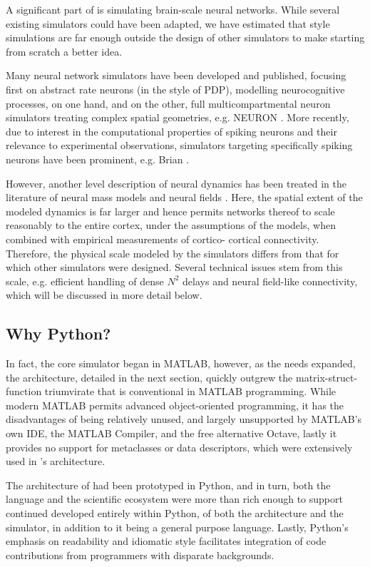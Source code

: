 A significant part of \TVB is simulating brain-scale neural networks. While
several existing simulators could have been adapted, we have estimated that
\TVB style simulations are far enough outside the design of other simulators to
make starting from scratch a better idea.

Many neural network simulators have been developed and published, focusing
first on abstract rate neurons (in the style of PDP), modelling neurocognitive
processes, on one hand, and on the other, full multicompartmental neuron
simulators treating complex spatial geometries, e.g. NEURON \cite{Hines_2001}.
More recently, due to interest in the computational properties of spiking 
neurons and their relevance to experimental observations, simulators targeting
specifically spiking neurons have been prominent, e.g. Brian 
\cite{Goodman_2009}.

However, another level description of neural dynamics has been treated
in the literature of neural mass models and neural fields 
\cite{Deco_2008a, Coombes_2010}. Here, the spatial
extent of the modeled dynamics is far larger and hence permits networks 
thereof to scale reasonably to the entire cortex, under the assumptions 
of the models, when combined with empirical measurements of cortico-
cortical connectivity. Therefore, the physical scale modeled by the \TVB
simulators differs from that for which other simulators were designed.
Several technical issues stem from this scale, e.g. efficient handling
of dense $N^2$ delays and neural field-like connectivity, which will be
discussed in more detail below. 

\subsection{Why Python?}

In fact, the core simulator began in MATLAB, however, as the needs 
expanded, the architecture, detailed in the next section, quickly 
outgrew the matrix-struct-function triumvirate that is conventional
in MATLAB programming. While modern MATLAB permits advanced object-oriented
programming, it has the disadvantages of being relatively unused, and
largely unsupported by MATLAB's own IDE, the MATLAB Compiler, and the free
alternative Octave, lastly it provides no support for metaclasses or data
descriptors, which were extensively used in \TVB's architecture.

The architecture of \TVB had been prototyped in Python, and in turn, both the
language and the scientific ecosystem were more than rich enough to support
continued developed entirely within Python, of both the architecture and the
simulator, in addition to it being a general purpose language. Lastly, Python's
emphasis on readability and idiomatic style facilitates integration of 
code contributions from programmers with disparate backgrounds.

